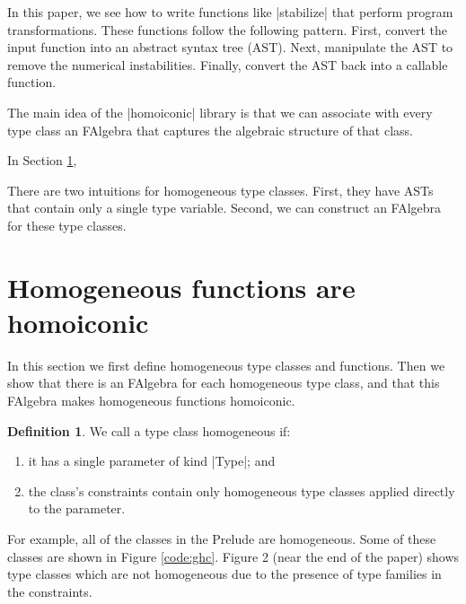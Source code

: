 \documentclass[preprint]{sigplanconf}
\theoremstyle{definition}
\newtheorem{defn}{Definition}
\begin{document}
In this paper, we see how to write functions like |stabilize| that perform program transformations.
These functions follow the following pattern.
First, convert the input function into an abstract syntax tree (AST).
Next, manipulate the AST to remove the numerical instabilities.
Finally, convert the AST back into a callable function.

The main idea of the |homoiconic| library is that we can associate with every type class an FAlgebra that captures the algebraic structure of that class.

In Section \ref{sec:homogeneous},

There are two intuitions for homogeneous type classes.
First, they have ASTs that contain only a single type variable.
Second, we can construct an FAlgebra for these type classes.

\section{Homogeneous functions are homoiconic}
\label{sec:homogeneous}

In this section we first define homogeneous type classes and functions.
Then we show that there is an FAlgebra for each homogeneous type class,
and that this FAlgebra makes homogeneous functions homoiconic.

\begin{defn}
We call a type class homogeneous if:
\begin{enumerate}
\item
it has a single parameter of kind |Type|; and
\item
the class's constraints contain only homogeneous type classes applied directly to the parameter.
\end{enumerate}
For example, all of the classes in the Prelude are homogeneous.
Some of these classes are shown in Figure \ref{code:ghc}.
Figure 2 (near the end of the paper) shows type classes which are not homogeneous due to the presence of type families in the constraints.
\end{defn}
\end{document}
